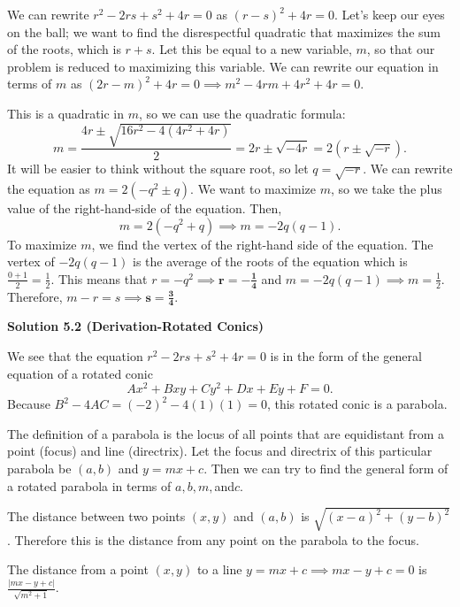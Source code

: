 \begin{enumerate}
We can rewrite $r^2-2rs+s^2+4r = 0$ as $(r-s)^2+4r = 0$. Let's keep our eyes on the ball; we want to find the disrespectful quadratic that maximizes the sum of the roots, which is $r+s$. Let this be equal to a new variable, $m$, so that our problem is reduced to maximizing this variable. We can rewrite our equation in terms of $m$ as $(2r-m)^2 + 4r = 0 \implies m^2- 4rm + 4r^2+4r = 0$. 

 This is a quadratic in $m$, so we can use the quadratic formula: 
 \[m = \frac{4r \pm \sqrt{16r^2-4(4r^2+4r)}}{2} = 2r \pm \sqrt{-4r} = 2\left(r \pm \sqrt{-r}\right).\]It will be easier to think without the square root, so let $q = \sqrt{-r}$. We can rewrite the equation as $m = 2(-q^2 \pm q)$. We want to maximize $m$, so we take the plus value of the right-hand-side of the equation. Then,
 \[m=2(-q^2+q) \implies m = -2q(q-1).\]To maximize $m$, we find the vertex of the right-hand side of the equation. The vertex of $-2q(q-1)$ is the average of the roots of the equation which is $\frac{0+1}{2} = \frac{1}{2}$. This means that $r = -q^2 \implies \boldsymbol{r = -\frac{1}{4}}$ and $m = -2q(q-1) \implies m = \frac{1}{2}$. Therefore, $m-r = s \implies \boldsymbol{s = \frac{3}{4}}$.

 



\textbf{Solution 5.2 (Derivation-Rotated Conics)}

We see that the equation $r^2-2rs+s^2+4r = 0$ is in the form of the general equation of a rotated conic 
 \[Ax^2+Bxy+Cy^2+Dx+Ey+F = 0.\] Because $B^2 -4AC = (-2)^2 - 4(1)(1) = 0$, this rotated conic is a parabola. 

 The definition of a parabola is the locus of all points that are equidistant from a point (focus) and line (directrix). Let the focus and directrix of this particular parabola be $(a,b)$ and $y = mx+c$. Then we can try to find the general form of a rotated parabola in terms of $a, b, m,$and$c$. 

 The distance between two points $(x,y)$ and $(a,b)$ is $\sqrt{(x-a)^2+(y-b)^2}$. Therefore this is the distance from any point on the parabola to the focus. 

 The distance from a point $(x,y)$ to a line $y = mx+c \implies mx-y+c = 0$ is $\frac{|mx-y+c|}{\sqrt{m^2+1}}$.


\end{enumerate}
